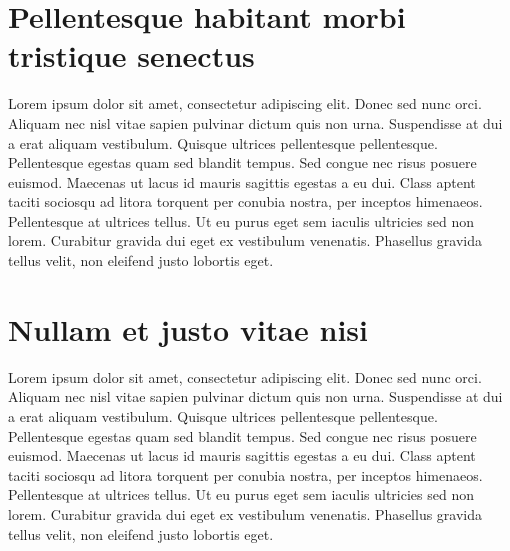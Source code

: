 \section{Pellentesque habitant morbi tristique senectus}
\label{sec:context}

Lorem ipsum dolor sit amet, consectetur adipiscing elit. Donec sed nunc orci. Aliquam nec nisl vitae sapien pulvinar dictum quis non urna. Suspendisse at dui a erat aliquam vestibulum. Quisque ultrices pellentesque pellentesque. Pellentesque egestas quam sed blandit tempus. Sed congue nec risus posuere euismod. Maecenas ut lacus id mauris sagittis egestas a eu dui. Class aptent taciti sociosqu ad litora torquent per conubia nostra, per inceptos himenaeos. Pellentesque at ultrices tellus. Ut eu purus eget sem iaculis ultricies sed non lorem. Curabitur gravida dui eget ex vestibulum venenatis. Phasellus gravida tellus velit, non eleifend justo lobortis eget.
\cite{ictbusiness}
\cite{donoho}

\section{Nullam et justo vitae nisi}
\label{sec:problem}

Lorem ipsum dolor sit amet, consectetur adipiscing elit. Donec sed nunc orci. Aliquam nec nisl vitae sapien pulvinar dictum quis non urna. Suspendisse at dui a erat aliquam vestibulum. Quisque ultrices pellentesque pellentesque. Pellentesque egestas quam sed blandit tempus. Sed congue nec risus posuere euismod. Maecenas ut lacus id mauris sagittis egestas a eu dui. Class aptent taciti sociosqu ad litora torquent per conubia nostra, per inceptos himenaeos. Pellentesque at ultrices tellus. Ut eu purus eget sem iaculis ultricies sed non lorem. Curabitur gravida dui eget ex vestibulum venenatis. Phasellus gravida tellus velit, non eleifend justo lobortis eget.


